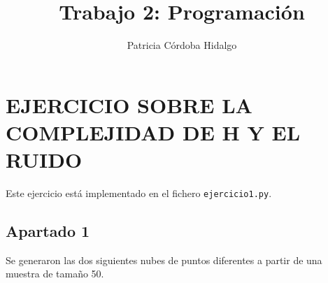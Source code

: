 \documentclass{article}
\begin{document}
\title{Trabajo 2: Programación}
\author{Patricia Córdoba Hidalgo}
\date{}
\maketitle

\tableofcontents

\section{EJERCICIO SOBRE LA COMPLEJIDAD DE H Y EL RUIDO}

Este ejercicio está implementado en el fichero \texttt{ejercicio1.py}.\\

\subsection{Apartado 1}

Se generaron las dos siguientes nubes de puntos diferentes a partir de una muestra de tamaño 50.

\begin{figure}[H]
  \centering
\end{figure}
\end{document}
